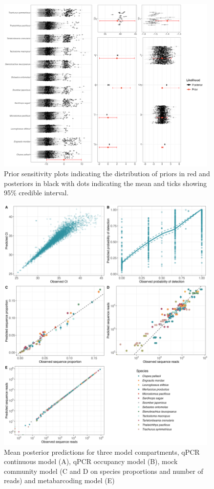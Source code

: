 \documentclass{article}
\begin{document}
\begin{figure}
\centering
\includegraphics[width=0.98\textwidth]{plots/12_Diagnostic_Fig_2.jpg}
\caption{Prior sensitivity plots indicating the distribution of priors in red and posteriors in black with dots indicating the mean and ticks showing 95\% credible interval.}
\label{tab:prior_sensitivity}
\end{figure}

\begin{figure}
\centering
\includegraphics[width=0.98\textwidth]{plots/9_Supplementary_Figure_5.jpg}
\caption{Mean posterior predictions for three model compartments, qPCR continuous model (A), qPCR occupancy model (B), mock community model (C and D on species proportions and number of reads) and metabarcoding model (E)}
\label{tab:PPC}
\end{figure}
\end{document}
